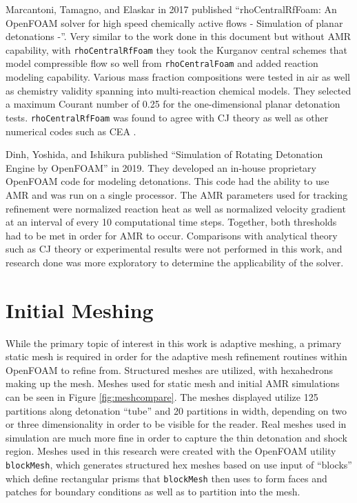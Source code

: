 Marcantoni, Tamagno, and Elaskar in 2017 published ``rhoCentralRfFoam: An OpenFOAM solver for high speed chemically active flows - Simulation of planar detonations -''\cite{marcantoni}. Very similar to the work done in this document but without AMR capability, with \verb|rhoCentralRfFoam| they took the Kurganov central schemes that model compressible flow so well from \verb|rhoCentralFoam| and added reaction modeling capability. Various mass fraction compositions were tested in air as well as chemistry validity spanning into multi-reaction chemical models. They selected a maximum Courant number of 0.25 for the one-dimensional planar detonation tests. \verb|rhoCentralRfFoam| was found to agree with CJ theory as well as other numerical codes such as CEA \cite{CEA}. 

Dinh, Yoshida, and Ishikura published ``Simulation of Rotating Detonation Engine by OpenFOAM''\cite{dinh} in 2019. They developed an in-house proprietary OpenFOAM code for modeling detonations. This code had the ability to use AMR and was run on a single processor. The AMR parameters used for tracking refinement were normalized reaction heat as well as normalized velocity gradient at an interval of every 10 computational time steps. Together, both thresholds had to be met in order for AMR to occur. Comparisons with analytical theory such as CJ theory or experimental results were not performed in this work, and research done was more exploratory to determine the applicability of the solver. 






\section{Initial Meshing}
While the primary topic of interest in this work is adaptive meshing, a primary static mesh is required in order for the adaptive mesh refinement routines within OpenFOAM to refine from. Structured meshes are utilized, with hexahedrons making up the mesh. Meshes used for static mesh and initial AMR simulations can be seen in Figure \ref{fig:meshcompare}. The meshes displayed utilize 125 partitions along detonation ``tube'' and 20 partitions in width, depending on two or three dimensionality in order to be visible for the reader. Real meshes used in simulation are much more fine in order to capture the thin detonation and shock region. Meshes used in this research were created with the OpenFOAM utility \verb|blockMesh|, which generates structured hex meshes based on use input of ``blocks'' which define rectangular prisms that \verb|blockMesh| then uses to form faces and patches for boundary conditions as well as to partition into the mesh. 

